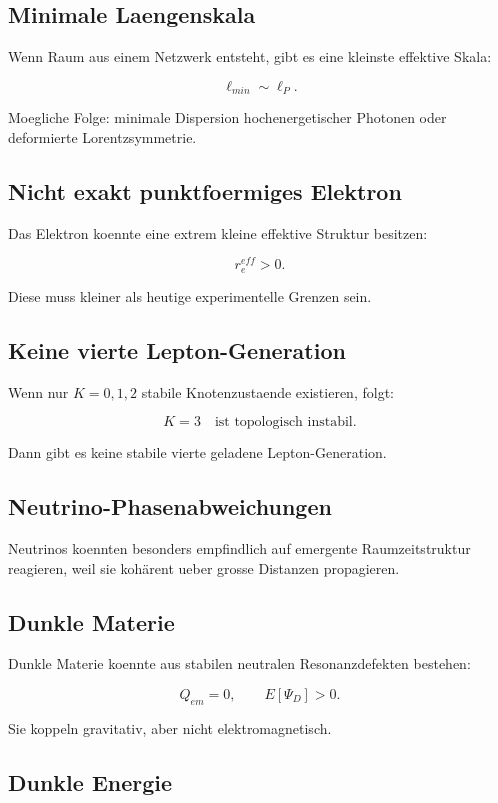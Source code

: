 \documentclass[11pt,a4paper]{article}
\begin{document}
\subsection{Minimale Laengenskala}

Wenn Raum aus einem Netzwerk entsteht, gibt es eine kleinste effektive Skala:

\[
\ell_{min}\sim \ell_P.
\]

Moegliche Folge: minimale Dispersion hochenergetischer Photonen oder deformierte Lorentzsymmetrie.

\subsection{Nicht exakt punktfoermiges Elektron}

Das Elektron koennte eine extrem kleine effektive Struktur besitzen:

\[
r_e^{eff}>0.
\]

Diese muss kleiner als heutige experimentelle Grenzen sein.

\subsection{Keine vierte Lepton-Generation}

Wenn nur $K=0,1,2$ stabile Knotenzustaende existieren, folgt:

\[
K=3 \quad \text{ist topologisch instabil}.
\]

Dann gibt es keine stabile vierte geladene Lepton-Generation.

\subsection{Neutrino-Phasenabweichungen}

Neutrinos koennten besonders empfindlich auf emergente Raumzeitstruktur reagieren, weil sie kohärent ueber grosse
Distanzen propagieren.

\subsection{Dunkle Materie}

Dunkle Materie koennte aus stabilen neutralen Resonanzdefekten bestehen:

\[
Q_{em}=0,\qquad E[\Psi_D]>0.
\]

Sie koppeln gravitativ, aber nicht elektromagnetisch.

\subsection{Dunkle Energie}
\end{document}
